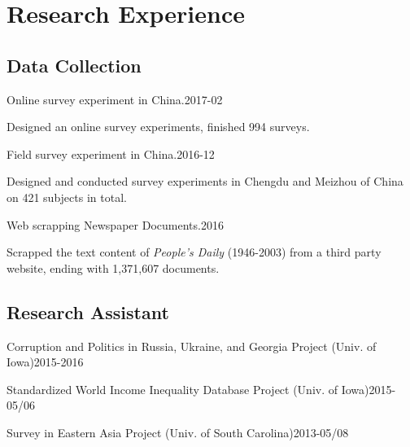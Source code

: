\documentclass[10.5pt,]{article}
\providecommand{\tightlist}{%
  \setlength{\itemsep}{0pt}\setlength{\parskip}{0pt}}
\renewenvironment{itemize}{
  \begin{list}{}{
    \setlength{\leftmargin}{1.5em}
  }
}{
  \end{list}
}
\begin{document}
\section{Research Experience}\label{research-experience}

\subsection{Data Collection}\label{data-collection}

\begin{itemize}
\tightlist
\item
  Online survey experiment in China.\hfill 2017-02

  \begin{itemize}
  \tightlist
  \item
    \footnotesize Designed an online survey experiments, finished 994
    surveys.
  \end{itemize}
\item
  Field survey experiment in China.\hfill 2016-12

  \begin{itemize}
  \tightlist
  \item
    \footnotesize Designed and conducted survey experiments in Chengdu
    and Meizhou of China on 421 subjects in total.
  \end{itemize}
\item
  Web scrapping Newspaper Documents.\hfill 2016

  \begin{itemize}
  \tightlist
  \item
    \footnotesize Scrapped the text content of \emph{People's Daily}
    (1946-2003) from a third party website, ending with 1,371,607
    documents.
  \end{itemize}
\end{itemize}

\subsection{Research Assistant}\label{research-assistant}

\begin{itemize}
\tightlist
\item
  Corruption and Politics in Russia, Ukraine, and Georgia Project (Univ.
  of Iowa)\hfill 2015-2016
\item
  Standardized World Income Inequality Database Project (Univ. of
  Iowa)\hfill 2015-05/06
\item
  Survey in Eastern Asia Project (Univ. of South
  Carolina)\hfill 2013-05/08
\end{itemize}
\end{document}
